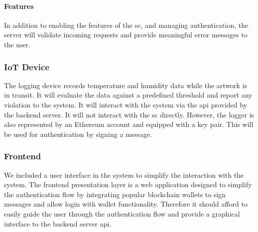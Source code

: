 \paragraph{Features}
In addition to enabling the features of the \gls{sc}, and managing authentication, the server will validate incoming requests and provide meaningful error messages to the user.

\subsubsection{IoT Device}
The logging device records temperature and humidity data while the artwork is in transit. It will evaluate the data against a predefined threshold and report any violation to the system. It will interact with the system via the \gls{api} provided by the backend server. It will not interact with the \gls{sc} directly. However, the logger is also represented by an Ethereum account and equipped with a key pair. This will be used for authentication by signing a message.

\subsubsection{Frontend}
We included a user interface in the system to simplify the interaction with the system. The frontend presentation layer is a web application designed to simplify the authentication flow by integrating popular blockchain wallets to sign messages and allow login with wallet functionality. Therefore it should afford to easily guide the user through the authentication flow and provide a graphical interface to the backend server \gls{api}.
